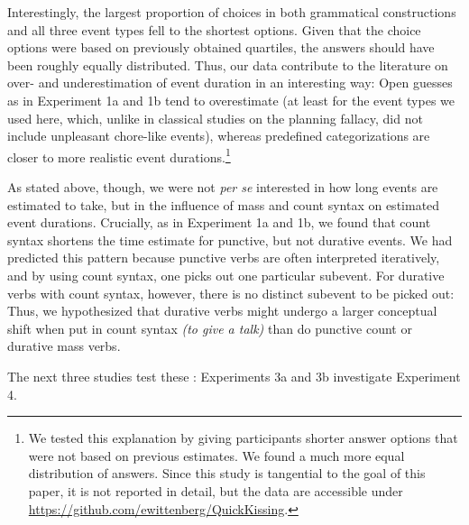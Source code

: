 \documentclass[preprint,12pt,authoryear]{elsarticle}
\begin{document}
Interestingly, the largest proportion of choices in both grammatical constructions and all three event types fell to the shortest options. Given that the choice options were based on previously obtained quartiles, the answers should have been roughly equally distributed. Thus, our data contribute to the literature on over- and underestimation of event duration in an interesting way: Open guesses as in Experiment 1a and 1b tend to overestimate (at least for the event types we used here, which, unlike in classical studies on the planning fallacy, did not include unpleasant chore-like events), whereas predefined categorizations are closer to more realistic event durations.\footnote{We tested this explanation by giving participants shorter answer options that were not based on previous estimates. We found a much more equal distribution of answers. Since this study is tangential to the goal of this paper, it is not reported in detail, but the data are accessible under \url{https://github.com/ewittenberg/QuickKissing}.} 

As stated above, though, we were not \emph{per se} interested in how long events are estimated to take, but in the influence of mass and count syntax on estimated event durations. Crucially, as in Experiment 1a and 1b, we found that count syntax shortens the time estimate for punctive, but not durative events. We had predicted this pattern because punctive verbs are often interpreted iteratively, and by using count syntax, one picks out one particular subevent. For durative verbs with count syntax, however, there is no distinct subevent to be picked out: Thus, we hypothesized that durative verbs might undergo a larger conceptual shift  when put in count syntax \emph{(to give a talk)} than do punctive count or durative mass verbs.

The next three studies test these : Experiments 3a and 3b investigate  Experiment 4. 
\end{document}
